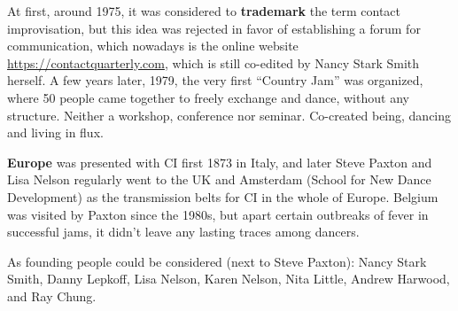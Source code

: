At first, around 1975, it was considered to \textbf{trademark} the term contact improvisation, but this idea was rejected in favor of establishing a forum for communication, which nowadays is the online website \url{https://contactquarterly.com}, which is still co-edited by Nancy Stark Smith herself.
A few years later, 1979, the very first ``Country Jam'' was organized, where 50 people came together to freely exchange and dance, without any structure.
Neither a workshop, conference nor seminar.
Co-created being, dancing and living in flux.

\textbf{Europe} was presented with CI first 1873 in Italy, and later Steve Paxton and Lisa Nelson regularly went to the UK and Amsterdam (School for New Dance Development) as the transmission belts for CI in the whole of Europe.
Belgium was visited by Paxton since the 1980s, but apart certain outbreaks of fever in successful jams, it didn't leave any lasting traces among dancers.

As founding people could be considered (next to Steve Paxton): Nancy Stark Smith, Danny Lepkoff, Lisa Nelson, Karen Nelson, Nita Little, Andrew Harwood, and Ray Chung.